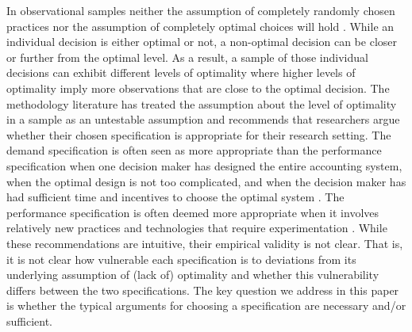 \documentclass[12pt]{article}
\begin{document}
In observational samples neither the assumption of completely randomly chosen practices nor the assumption of completely optimal choices will hold \citep{brynjolfsson_complementarity_2013}. While an individual decision is either optimal or not, a non-optimal decision can be closer or further from the optimal level. As a result, a sample of those individual decisions can exhibit different levels of optimality where higher levels of optimality imply more observations that are close to the optimal decision. The methodology literature has treated the assumption about the level of optimality in a sample as an untestable assumption and recommends that researchers argue whether their chosen specification is appropriate for their research setting. The demand specification is often seen as more appropriate than the performance specification when one decision maker has designed the entire accounting system, when the optimal design is not too complicated, and when the decision maker has had sufficient time and incentives to choose the optimal system \citep{grabner_management_2013, hofmann_organizational_2017, carree_note_2011, johansson_testing_2018}.  The performance specification is often deemed more appropriate when it involves relatively new practices and technologies that require experimentation \citep{carree_note_2011, bedford_management_2016}. While these recommendations are intuitive, their empirical validity is not clear. That is, it is not clear how vulnerable each specification is to deviations from its underlying assumption of (lack of) optimality and whether this vulnerability differs between the two specifications. The key question we address in this paper is whether the typical arguments for choosing a specification are necessary and/or sufficient.
\end{document}
